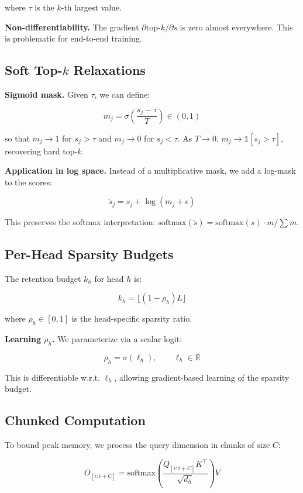 where $\tau$ is the $k$-th largest value.

\textbf{Non-differentiability.} The gradient $\partial \text{top-}k / \partial s$ 
is zero almost everywhere. This is problematic for end-to-end training.

\subsection{Soft Top-$k$ Relaxations}

\textbf{Sigmoid mask.} Given $\tau$, we can define:

\[
m_j = \sigma\!\left(\frac{s_j - \tau}{T}\right) \in (0, 1)
\]

so that $m_j \to 1$ for $s_j > \tau$ and $m_j \to 0$ for $s_j < \tau$. 
As $T \to 0$, $m_j \to \mathbb{1}[s_j > \tau]$, recovering hard top-$k$.

\textbf{Application in log space.} Instead of a multiplicative mask, we add a 
log-mask to the scores:

\[
\tilde{s}_j = s_j + \log(m_j + \epsilon)
\]

This preserves the softmax interpretation: $\text{softmax}(\tilde{s}) = 
\text{softmax}(s) \cdot m / \sum m$.

\subsection{Per-Head Sparsity Budgets}

The retention budget $k_h$ for head $h$ is:

\[
k_h = \lfloor (1 - \rho_h) L \rfloor
\]

where $\rho_h \in [0, 1]$ is the head-specific sparsity ratio.

\textbf{Learning $\rho_h$.} We parameterize via a scalar logit:

\[
\rho_h = \sigma(\ell_h), \qquad \ell_h \in \mathbb{R}
\]

This is differentiable w.r.t. $\ell_h$, allowing gradient-based learning of 
the sparsity budget.

\subsection{Chunked Computation}

To bound peak memory, we process the query dimension in chunks of size $C$:

\[
O_{[i:i+C]} = \text{softmax}\!\left(\frac{Q_{[i:i+C]} K^\top}{\sqrt{d_h}}\right) V
\]

